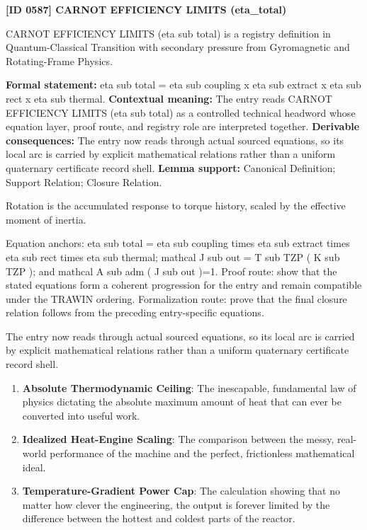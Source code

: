 \clearpage
\noindent\textbf{[ID 0587] CARNOT EFFICIENCY LIMITS (eta\_total)}\par
\vspace{0.35em}
\begingroup\small
{}
CARNOT EFFICIENCY LIMITS (eta sub total) is a registry definition in Quantum-Classical Transition with secondary pressure from Gyromagnetic and Rotating-Frame Physics.

\begingroup\footnotesize\setlength{\emergencystretch}{3em}\sloppy
\textbf{Formal statement:} eta sub total = eta sub coupling x eta sub extract x eta sub rect x eta sub thermal. \textbf{Contextual meaning:} The entry reads CARNOT EFFICIENCY LIMITS (eta sub total) as a controlled technical headword whose equation layer, proof route, and registry role are interpreted together. \textbf{Derivable consequences:} The entry now reads through actual sourced equations, so its local arc is carried by explicit mathematical relations rather than a uniform quaternary certificate record shell. \textbf{Lemma support:} Canonical Definition; Support Relation; Closure Relation.\par
\endgroup

Rotation is the accumulated response to torque history, scaled by the effective moment of inertia.

Equation anchors: eta sub total = eta sub coupling times eta sub extract times eta sub rect times eta sub thermal; mathcal J sub out = T sub TZP ( K sub TZP ); and mathcal A sub adm ( J sub out )=1. Proof route: show that the stated equations form a coherent progression for the entry and remain compatible under the TRAWIN ordering. Formalization route: prove that the final closure relation follows from the preceding entry-specific equations.

The entry now reads through actual sourced equations, so its local arc is carried by explicit mathematical relations rather than a uniform quaternary certificate record shell.
\endgroup

\begin{enumerate}[leftmargin=1.6em,itemsep=6pt,topsep=4pt]
\item \textbf{Absolute Thermodynamic Ceiling}: The inescapable, fundamental law of physics dictating the absolute maximum amount of heat that can ever be converted into useful work.
\item \textbf{Idealized Heat-Engine Scaling}: The comparison between the messy, real-world performance of the machine and the perfect, frictionless mathematical ideal.
\item \textbf{Temperature-Gradient Power Cap}: The calculation showing that no matter how clever the engineering, the output is forever limited by the difference between the hottest and coldest parts of the reactor.
\end{enumerate}

